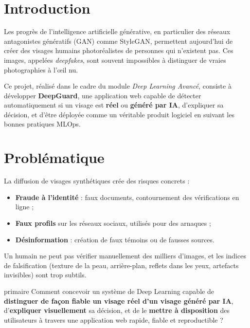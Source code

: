 \documentclass[11pt,a4paper]{article}
\newcommand{\nomprojet}{DeepGuard}
\begin{document}
\tableofcontents
\newpage

\section{Introduction}

Les progrès de l'intelligence artificielle générative, en particulier des réseaux antagonistes
génératifs (GAN) comme StyleGAN, permettent aujourd'hui de créer des visages humains
photoréalistes de personnes qui n'existent pas. Ces images, appelées \emph{deepfakes}, sont
souvent impossibles à distinguer de vraies photographies à l'œil nu.

Ce projet, réalisé dans le cadre du module \emph{Deep Learning Avancé}, consiste à développer
\textbf{\nomprojet}, une application web capable de détecter automatiquement si un visage est
\textbf{réel} ou \textbf{généré par IA}, d'expliquer sa décision, et d'être déployée comme un
véritable produit logiciel en suivant les bonnes pratiques MLOps.

\section{Problématique}

La diffusion de visages synthétiques crée des risques concrets :
\begin{itemize}
  \item \textbf{Fraude à l'identité} : faux documents, contournement des vérifications en ligne ;
  \item \textbf{Faux profils} sur les réseaux sociaux, utilisés pour des arnaques ;
  \item \textbf{Désinformation} : création de faux témoins ou de fausses sources.
\end{itemize}

Un humain ne peut pas vérifier manuellement des milliers d'images, et les indices de
falsification (texture de la peau, arrière-plan, reflets dans les yeux, artefacts invisibles)
sont trop subtils.

\begin{encadre}[title={Problématique}]{primaire}
Comment concevoir un système de Deep Learning capable de \textbf{distinguer de façon fiable un
visage réel d'un visage généré par IA}, d'\textbf{expliquer visuellement} sa décision, et de le
\textbf{mettre à disposition} des utilisateurs à travers une application web rapide, fiable et
reproductible ?
\end{encadre}
\end{document}
